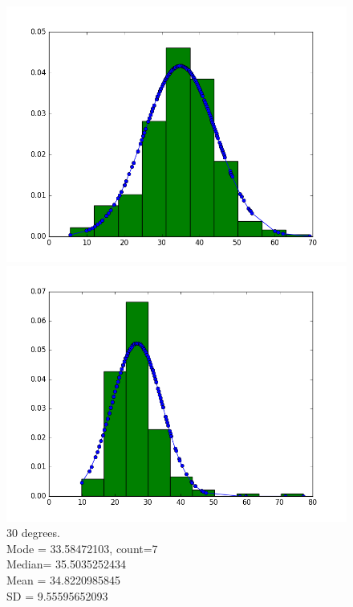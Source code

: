 \documentclass[12pt]{article}
\numberwithin{figure}{section}
\numberwithin{table}{section}
\begin{document}
\begin{figure}[H]
  \centering
  \begin{minipage}[b]{0.4\textwidth}
    \includegraphics[width=\textwidth]{angle30.png}
    \caption[Estimation at angle 30 degrees]{30 degrees.
    \\\hspace{\textwidth}Mode   = 33.58472103, count=7
	\\\hspace{\textwidth}	Median= 35.5035252434
	\\\hspace{\textwidth}	Mean   = 34.8220985845
	\\\hspace{\textwidth}	SD       = 9.55595652093}
  \end{minipage} 
  \hfill
  \begin{minipage}[b]{0.4\textwidth}
    \includegraphics[width=\textwidth]{angle20.png}

\end{minipage}
\end{figure}
\end{document}
